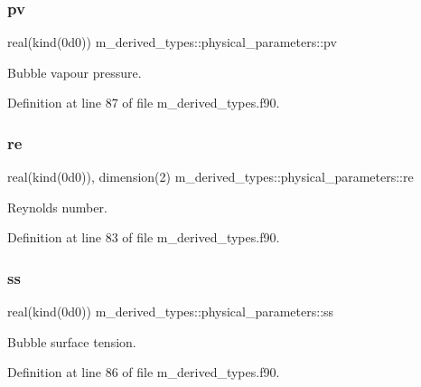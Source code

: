 \subsubsection{\texorpdfstring{pv}{pv}}
{\footnotesize\ttfamily real(kind(0d0)) m\+\_\+derived\+\_\+types\+::physical\+\_\+parameters\+::pv}



Bubble vapour pressure. 



Definition at line 87 of file m\+\_\+derived\+\_\+types.\+f90.

\mbox{\label{structm__derived__types_1_1physical__parameters_a47283d1eddead753f9c3d60ed982df49}} 
\subsubsection{\texorpdfstring{re}{re}}
{\footnotesize\ttfamily real(kind(0d0)), dimension(2) m\+\_\+derived\+\_\+types\+::physical\+\_\+parameters\+::re}



Reynolds number. 



Definition at line 83 of file m\+\_\+derived\+\_\+types.\+f90.

\mbox{\label{structm__derived__types_1_1physical__parameters_aabd7a1fe772c4e9a6e2f108266ebd94e}} 
\subsubsection{\texorpdfstring{ss}{ss}}
{\footnotesize\ttfamily real(kind(0d0)) m\+\_\+derived\+\_\+types\+::physical\+\_\+parameters\+::ss}



Bubble surface tension. 



Definition at line 86 of file m\+\_\+derived\+\_\+types.\+f90.

